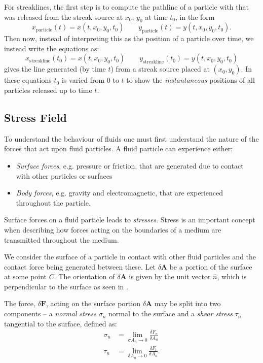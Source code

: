 For streaklines, the first step is to compute the pathline of a particle with  that was released from the streak source at $x_0$, $y_0$ at time $t_0$, in the form
\[ 
x_{\text{particle}} (t) = x(t, x_0, y_0, t_0) \qquad y_{\text{particle}}(t) = y(t, x_0, y_0, t_0)
.\]
Then now, instead of interpreting this as the position of a particle over time, we instead write the equations as:
\begin{equation}\label{eq:streak}
  x_{\text{streakline}} \left( t_0 \right) = x \left( t, x_0, y_0, t_0 \right) \qquad y_{\text{streakline}} \left( t_0 \right) = y \left( t, x_0, y_0, t_0 \right)
\end{equation}
 gives the line generated (by time $t$) from a streak source placed at $(x_0, y_0)$. In these equations $t_0$ is varied from $0$ to $t$ to show the \textit{instantaneous} positions of all particles released up to time $t$. 

\subsection{Stress Field}
To understand the behaviour of fluids one must first understand the nature of the forces that act upon fluid particles. A fluid particle can experience either:
\begin{itemize}
  \item \textit{Surface forces}, e.g. pressure or friction, that are generated due to contact with other particles or surfaces
  \item \textit{Body forces}, e.g. gravity and electromagnetic, that are experienced throughout the particle.
\end{itemize}

Surface forces on a fluid particle leads to \textit{stresses}. Stress is an important concept when describing how forces acting on the boundaries of a medium are transmitted throughout the medium. 

We consider the surface of a particle in contact with other fluid particles and the contact force being generated between these. Let $\delta \textbf{A}$ be a portion of the surface at some point $C$. The orientation of $\delta \textbf{A}$ is given by the unit vector $\hat{n}$, which is perpendicular to the surface as seen in .

The force, $\delta \textbf{F}$, acting on the surface portion $\delta \textbf{A}$ may be split into two components -- a \textit{normal stress} $\sigma_n$ normal to the surface and a \textit{shear stress} $\tau_n$ tangential to the surface, defined as:
\begin{align*}
  \sigma_n &= \lim_{\sigma A_n \to 0} \frac{\delta F_n}{\delta A_n} \\
  \tau_n &= \lim_{\delta A_n \to 0} \frac{\delta F_t}{\delta A_n}
.\end{align*}

